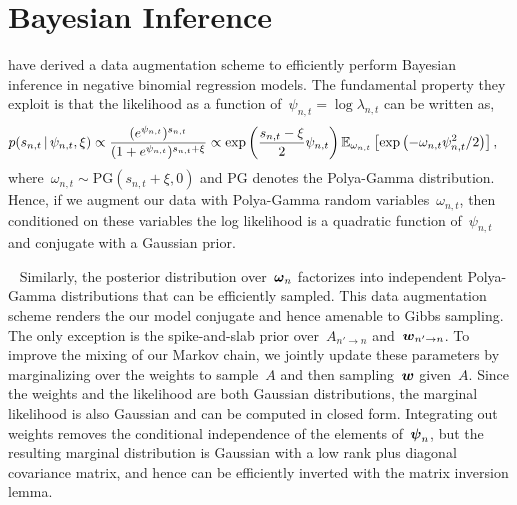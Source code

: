 \documentclass[aos,noinfoline]{imsart} %
\begin{document}
\section{Bayesian Inference}
\citet{Pillow2012} have derived a data augmentation scheme to efficiently perform Bayesian inference in negative binomial regression models. The fundamental  property they exploit is that the likelihood as a function of~${\psi_{n,t}=\log \lambda_{n,t}}$ can be written as,
\begin{align}
p(s_{n,t} \given \psi_{n,t}, \xi) &\propto \frac{(e^{\psi_{n,t}})^{s_{n,t}}}{(1 + e^{\psi_{n,t}})^{s_{n,t} + \xi}}
 \propto  \exp \left(\frac{s_{n,t}-\xi}{2} \psi_{n,t}\right) \mathbb{E}_{\omega_{n,t}}\left[ \exp\left(-\omega_{n,t} \psi_{n,t}^2 / 2\right)\right],
\end{align}
where~${\omega_{n,t} \sim \text{PG} (s_{n,t}+\xi, 0)}$ and PG denotes the Polya-Gamma distribution. Hence, if we augment our data with Polya-Gamma random variables~${\omega_{n,t}}$, then conditioned on these variables the log likelihood is a quadratic function of~$\psi_{n,t}$ and conjugate with a Gaussian prior.  
~

~
Similarly, the posterior distribution over~$\boldsymbol{\omega}_{n}$ factorizes into independent Polya-Gamma distributions that can be efficiently sampled.  This data augmentation scheme renders the our model conjugate and hence amenable to Gibbs sampling. The only exception is the spike-and-slab prior over~$A_{n'\to n}$ and~$\boldsymbol{w}_{n'\to n}$. To improve the mixing of our Markov chain, we jointly update these parameters by marginalizing over the weights to sample~$A$ and then sampling~$\boldsymbol{w}$ given~$A$. Since the weights and the likelihood are both Gaussian distributions, the marginal likelihood is also Gaussian and can be computed in closed form.  Integrating out weights removes the conditional independence of the elements of~$\boldsymbol{\psi}_n$, but the resulting marginal distribution is Gaussian with a low rank plus diagonal covariance matrix, and hence can be efficiently inverted with the matrix inversion lemma.  
\end{document}
